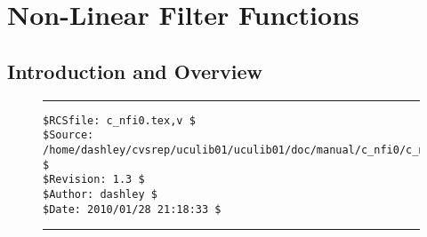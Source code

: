 
\chapter{Non-Linear Filter Functions}

\label{cnfi0}


\section{Introduction and Overview}
\label{cnfi0:siov0}


\noindent\begin{figure}[!b]
\noindent\rule[-0.25in]{\textwidth}{1pt}
\begin{tiny}
\begin{verbatim}
$RCSfile: c_nfi0.tex,v $
$Source: /home/dashley/cvsrep/uculib01/uculib01/doc/manual/c_nfi0/c_nfi0.tex,v $
$Revision: 1.3 $
$Author: dashley $
$Date: 2010/01/28 21:18:33 $
\end{verbatim}
\end{tiny}
\noindent\rule[0.25in]{\textwidth}{1pt}
\end{figure}

%
%

